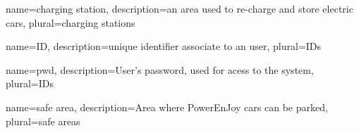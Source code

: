 {
  name={charging station},
  description={an area used to re-charge and store electric cars},
  plural={charging stations}
}

{
  name={ID},
  description={unique identifier associate to an user},
  plural={IDs}
}

{
  name={pwd},
  description={User's password, used for acess to the system},
  plural={IDs}
}

{
  name={safe area},
  description={Area where PowerEnJoy cars can be parked},
  plural={safe areas}
}

\begin{comment}
\newglossaryentry{battery}
{
  name={battery},
  description={},
  plural={batteries}
}
\end{comment}



